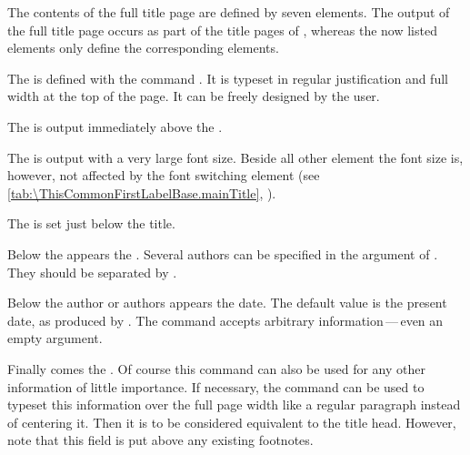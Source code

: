 \begin{Declaration}
\end{Declaration}%
The contents of the full title page are defined by seven elements. The output
of the full title page occurs as part of the title pages of
, whereas the now listed elements
only define the corresponding elements.

The  is defined with the command
. It is typeset in regular justification and full width at
the top of the page. It can be freely designed by the user.

The  is
output immediately above the .

The  is output with a very large font
size.  Beside all other element the font size
is, however, not affected by the font switching element 
(see \autoref{tab:\ThisCommonFirstLabelBase.mainTitle},
).

The
 is set just below the title.

Below the  appears the
.  Several authors can be specified in
the argument of . They should be separated by .

Below the author or authors appears the
date. The default value is the present date, as produced by
. The  command accepts arbitrary
information\,---\,even an empty argument.

Finally comes the
. Of course this command can also
be used for any other information of little importance. If necessary, the
 command can be used to typeset this information over the full
page width like a regular paragraph instead of centering it.  Then it is to be
considered equivalent to the title head. However, note that this field is put
above any existing footnotes.

